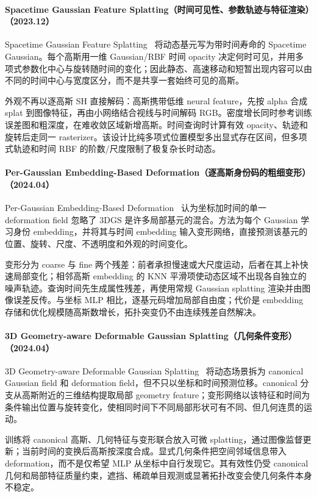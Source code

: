 \paragraph{Spacetime Gaussian Feature Splatting（时间可见性、参数轨迹与特征渲染）（2023.12）}
Spacetime Gaussian Feature Splatting~\cite{2312_16812} 将动态基元写为带时间寿命的 Spacetime Gaussian。每个高斯用一维 Gaussian/RBF 时间 opacity 决定何时可见，并用多项式参数化中心与旋转随时间的变化；因此静态、高速移动和短暂出现内容可以由不同的时间中心与宽度区分，而不是共享一套始终可见的高斯。

外观不再以逐高斯 SH 直接解码：高斯携带低维 neural feature，先按 alpha 合成 splat 到图像特征，再由小网络结合视线与时间解码 RGB。密度增长同时参考训练误差图和粗深度，在难收敛区域新增高斯。时间查询时计算有效 opacity、轨迹和旋转后走同一 rasterizer。该设计比纯多项式位置模型多出显式存在区间，但多项式轨迹和时间 RBF 的阶数/尺度限制了极复杂长时动态。

\paragraph{Per-Gaussian Embedding-Based Deformation（逐高斯身份码的粗细变形）（2024.04）}
Per-Gaussian Embedding-Based Deformation~\cite{2404_03613} 认为坐标加时间的单一 deformation field 忽略了 3DGS 是许多局部基元的混合。方法为每个 Gaussian 学习身份 embedding，并将其与时间 embedding 输入变形网络，直接预测该基元的位置、旋转、尺度、不透明度和外观的时间变化。

变形分为 coarse 与 fine 两个残差：前者承担慢速或大尺度运动，后者在其上补快速局部变化；相邻高斯 embedding 的 KNN 平滑项使动态区域不出现各自独立的噪声轨迹。查询时间先生成属性残差，再使用常规 Gaussian splatting 渲染并由图像误差反传。与坐标 MLP 相比，逐基元码增加局部自由度；代价是 embedding 存储和优化规模随高斯数增长，拓扑突变仍不由连续残差自然解决。

\paragraph{3D Geometry-aware Deformable Gaussian Splatting（几何条件变形）（2024.04）}
3D Geometry-aware Deformable Gaussian Splatting~\cite{2404_06270} 将动态场景拆为 canonical Gaussian field 和 deformation field，但不只以坐标和时间预测位移。canonical 分支从高斯附近的三维结构提取局部 geometry feature；变形网络以该特征和时间为条件输出位置与旋转变化，使相同时间下不同局部形状可有不同、但几何连贯的运动。

训练将 canonical 高斯、几何特征与变形联合放入可微 splatting，通过图像监督更新；当前时间的变换后高斯按深度合成。显式几何条件把空间邻域信息带入 deformation，而不是仅希望 MLP 从坐标中自行发现它。其有效性仍受 canonical 几何和局部特征质量约束，遮挡、稀疏单目观测或显著拓扑改变会使几何条件本身不稳定。

